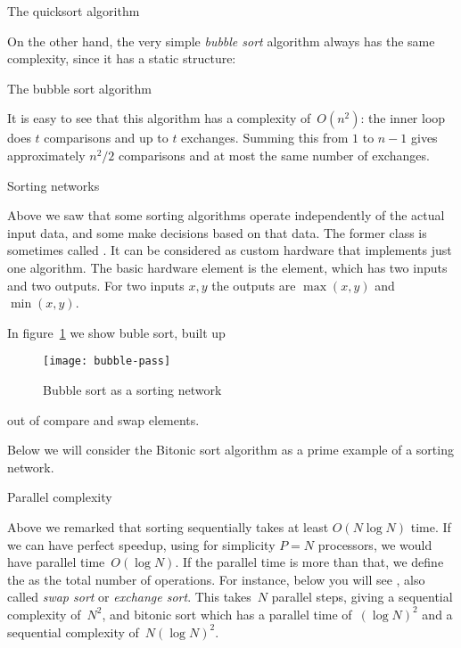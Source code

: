 \begin{displayalgorithm}
  \caption{The quicksort algorithm}
\end{displayalgorithm}

On the other hand, the very simple \emph{bubble
  sort} algorithm
always has the same complexity, since it has a static structure:

\begin{displayalgorithm}
  \caption{The bubble sort algorithm}
\end{displayalgorithm}

It is easy to see that this algorithm has a complexity of~$O(n^2)$:
the inner loop does $t$ comparisons and up to $t$ exchanges. Summing
this from $1$ to $n-1$ gives approximately $n^2/2$ comparisons and
at most the same number of exchanges.

 {Sorting networks}

Above we saw that some sorting algorithms operate independently of the
actual input data, and some make decisions based on that data.
The former class is sometimes
called . It can be considered
as custom hardware that implements just one algorithm. The 
basic hardware element is the 
element, which has two inputs and two outputs. For two inputs $x,y$
the outputs are $\max(x,y)$ and $\min(x,y)$.

In figure~\ref{fig:bubble-pass} we show buble sort, built up
%
\begin{figure}[ht]
  \texttt{[image: bubble-pass]}
  \caption{Bubble sort as a sorting network}
  \label{fig:bubble-pass}
\end{figure}
%
out of compare and swap elements.

Below we will consider the Bitonic sort algorithm
as a prime example of a sorting network.

 {Parallel complexity}

Above we remarked that sorting sequentially takes at least $O(N\log N)$ time.
If we can have perfect speedup, using for simplicity $P=N$ processors,
we would have parallel time~$O(\log N)$. If the parallel time
is more than that, we define the 
as the total number of operations. For instance, below you will see
,
also called \emph{swap sort}
or \emph{exchange sort}.
This takes~$N$ parallel steps,
giving a sequential complexity of~$N^2$, and bitonic sort
which has a parallel time of~$(\log N)^2$ and a
sequential complexity of~$N(\log N)^2$.

